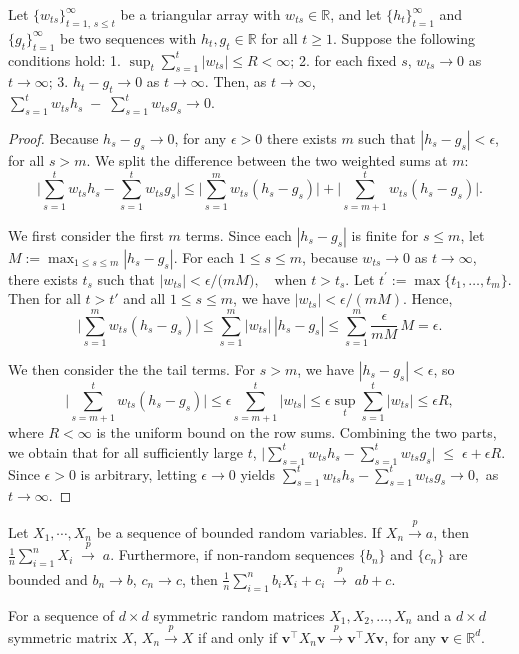 \documentclass[12pt]{article}
\begin{document}
\begin{lemma}
\label{lemma:Toeplitz}
Let $\{w_{ts}\}_{t=1,\,s \le t}^\infty$ be a triangular array with $w_{ts} \in \mathbb{R}$, 
and let $\{h_t\}_{t=1}^\infty$ and $\{g_t\}_{t=1}^\infty$ be two sequences with $h_t, g_t \in \mathbb{R}$ for all $t \ge 1$.
Suppose the following conditions hold:
1. $\displaystyle \sup_{t} \sum_{s=1}^t |w_{ts}| \le R < \infty$; 2. for each fixed $s$, $w_{ts} \to 0$ as $t \to \infty$; 3. $h_t - g_t \to 0$ as $t \to \infty$. 
Then, as $t \to \infty$, $\sum_{s=1}^t w_{ts} h_s \;-\; \sum_{s=1}^t w_{ts} g_s \to 0$.
\end{lemma}

\begin{proof}
 Because $h_s - g_s \to 0$, for any $\epsilon > 0$ there exists $m$ such that $|h_s - g_s| < \epsilon$, for all $s > m$. We split the difference between the two weighted sums at $m$:
\[
\Biggl|\sum_{s=1}^t w_{ts} h_s - \sum_{s=1}^t w_{ts} g_s \Biggr|
\le \Biggl|\sum_{s=1}^m w_{ts} (h_s-g_s)\Biggr|
   + \Biggl|\sum_{s=m+1}^t w_{ts} (h_s-g_s)\Biggr|.
\]

\noindent
We first consider the first $m$ terms. Since each $|h_s - g_s|$ is finite for $s \le m$, let $
M := \max_{1 \le s \le m} |h_s - g_s|. $
For each $1 \le s \le m$, because $w_{ts} \to 0$ as $t \to \infty$, there exists $t_s$ such that  $
|w_{ts}| <  {\epsilon}/({mM)}, \quad \text{when } t > t_s.$
Let $t^\prime := \max\{t_1, \dots, t_m\}$. Then for all $t > t'$ and all $1 \le s \le m$, we have $|w_{ts}| < \epsilon/(mM)$. Hence,
\[
\Biggl|\sum_{s=1}^m w_{ts} (h_s-g_s)\Biggr|
\le \sum_{s=1}^m |w_{ts}|\,|h_s-g_s|
\le \sum_{s=1}^m \frac{\epsilon}{mM}\,M = \epsilon.
\]

\noindent
We then consider the the tail terms. 
For $s > m$, we have $|h_s - g_s| < \epsilon$, so
\[
\Biggl|\sum_{s=m+1}^t w_{ts} (h_s-g_s)\Biggr|
\le \epsilon \sum_{s=m+1}^t |w_{ts}|
\le \epsilon \sup_{t}\sum_{s=1}^t |w_{ts}|
\le \epsilon R ,
\]
where $R < \infty$ is the uniform bound on the row sums. 
Combining the two parts, we obtain that for all sufficiently large $t$,
$ 
\Biggl|\sum_{s=1}^t w_{ts} h_s - \sum_{s=1}^t w_{ts} g_s\Biggr|
\;\le\; \epsilon + \epsilon R. $ 
Since $\epsilon > 0$ is arbitrary, letting $\epsilon \to 0$ yields
$ 
\sum_{s=1}^t w_{ts} h_s - \sum_{s=1}^t w_{ts} g_s \to 0, $ 
as $t \to \infty$.
\end{proof}


\begin{lemma}
\label{lemma:weighted-convergence}
Let $X_1, \cdots, X_n$ be a sequence of bounded random variables.  
If $X_n \stackrel{p}{\to} a$, then $\frac{1}{n}\sum_{i=1}^n X_i \;\stackrel{p}{\to}\; a$. Furthermore, if non-random sequences $\{b_n\}$ and $\{c_n\}$ are bounded and $b_n \to b$, $c_n \to c$, then $\frac{1}{n}\sum_{i=1}^n b_i X_i + c_i \;\stackrel{p}{\to}\; ab + c$.
\end{lemma}


\begin{lemma}
\label{lemma:matrix-convergence}
For a sequence of $d \times d$ symmetric random matrices $X_1, X_2, \dots, X_n$ 
and a $d \times d$ symmetric matrix $X$, $X_n \stackrel{p}{\to} X$ if and only if $\bm{v}^\top X_n \bm{v} \stackrel{p}{\to} \bm{v}^\top X \bm{v}$, for any $\bm{v} \in \mathbb{R}^d$.
\end{lemma}
\end{document}
